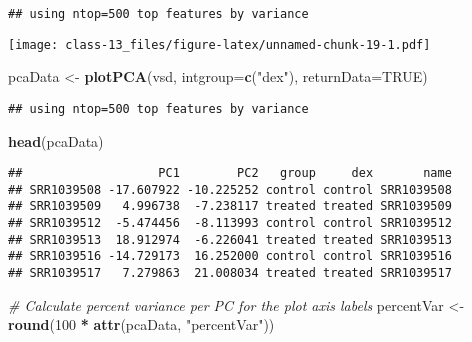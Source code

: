 \documentclass[
]{article}
\newenvironment{Shaded}{\begin{snugshade}}{\end{snugshade}}
\newcommand{\AttributeTok}[1]{\textcolor[rgb]{0.13,0.29,0.53}{#1}}
\newcommand{\CommentTok}[1]{\textcolor[rgb]{0.56,0.35,0.01}{\textit{#1}}}
\newcommand{\ConstantTok}[1]{\textcolor[rgb]{0.56,0.35,0.01}{#1}}
\newcommand{\DecValTok}[1]{\textcolor[rgb]{0.00,0.00,0.81}{#1}}
\newcommand{\FunctionTok}[1]{\textcolor[rgb]{0.13,0.29,0.53}{\textbf{#1}}}
\newcommand{\NormalTok}[1]{#1}
\newcommand{\OtherTok}[1]{\textcolor[rgb]{0.56,0.35,0.01}{#1}}
\newcommand{\SpecialCharTok}[1]{\textcolor[rgb]{0.81,0.36,0.00}{\textbf{#1}}}
\newcommand{\StringTok}[1]{\textcolor[rgb]{0.31,0.60,0.02}{#1}}
\begin{document}
\begin{verbatim}
## using ntop=500 top features by variance
\end{verbatim}

\texttt{[image: class-13\_files/figure-latex/unnamed-chunk-19-1.pdf]}

\begin{Shaded}
\begin{Highlighting}[]
\NormalTok{pcaData }\OtherTok{\textless{}{-}} \FunctionTok{plotPCA}\NormalTok{(vsd, }\AttributeTok{intgroup=}\FunctionTok{c}\NormalTok{(}\StringTok{"dex"}\NormalTok{), }\AttributeTok{returnData=}\ConstantTok{TRUE}\NormalTok{)}
\end{Highlighting}
\end{Shaded}

\begin{verbatim}
## using ntop=500 top features by variance
\end{verbatim}

\begin{Shaded}
\begin{Highlighting}[]
\FunctionTok{head}\NormalTok{(pcaData)}
\end{Highlighting}
\end{Shaded}

\begin{verbatim}
##                   PC1        PC2   group     dex       name
## SRR1039508 -17.607922 -10.225252 control control SRR1039508
## SRR1039509   4.996738  -7.238117 treated treated SRR1039509
## SRR1039512  -5.474456  -8.113993 control control SRR1039512
## SRR1039513  18.912974  -6.226041 treated treated SRR1039513
## SRR1039516 -14.729173  16.252000 control control SRR1039516
## SRR1039517   7.279863  21.008034 treated treated SRR1039517
\end{verbatim}

\begin{Shaded}
\begin{Highlighting}[]
\CommentTok{\# Calculate percent variance per PC for the plot axis labels}
\NormalTok{percentVar }\OtherTok{\textless{}{-}} \FunctionTok{round}\NormalTok{(}\DecValTok{100} \SpecialCharTok{*} \FunctionTok{attr}\NormalTok{(pcaData, }\StringTok{"percentVar"}\NormalTok{))}
\end{Highlighting}
\end{Shaded}
\end{document}
